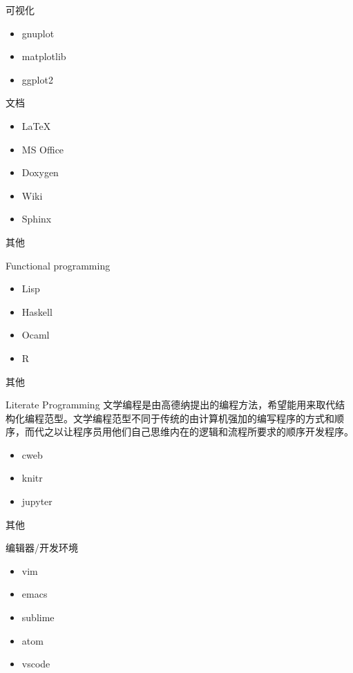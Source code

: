 \documentclass{beamer}
\begin{document}
\begin{frame}[t]{可视化}
\begin{block}{}
\begin{itemize}
\item gnuplot
\item matplotlib
\item ggplot2
\end{itemize}
\end{block}
\end{frame}


\begin{frame}[t]{文档}
\begin{block}{}
\begin{itemize}
\item \LaTeX{}
\item MS Office
\item Doxygen
\item Wiki
\item Sphinx
\end{itemize}
\end{block}
\end{frame}

\begin{frame}[t]{其他}
\begin{block}{Functional programming}
\begin{itemize}
\item Lisp
\item Haskell
\item Ocaml
\item R 
\end{itemize}
\end{block}
\end{frame}

\begin{frame}[t]{其他}
\begin{block}{Literate Programming}
    文学编程是由高德纳提出的编程方法，希望能用来取代结构化编程范型。文学编程范型不同于传统的由计算机强加的编写程序的方式和顺序，而代之以让程序员用他们自己思维内在的逻辑和流程所要求的顺序开发程序。
\begin{itemize}
\item cweb
\item knitr
\item jupyter
\end{itemize}
\end{block}
\end{frame}

\begin{frame}[t]{其他}
\begin{block}{编辑器/开发环境}
\begin{itemize}
\item vim
\item emacs
\item sublime
\item atom 
\item vscode
\end{itemize}
\end{block}
\end{frame}
\end{document}
